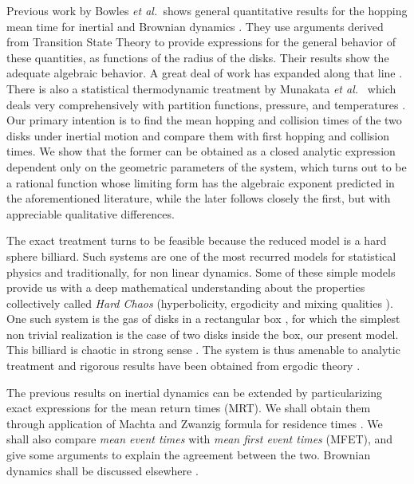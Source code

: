 \documentclass[letterpaper,10pt, jcp, aps]{revtex4-1}
\newcommand{\etal}{\emph{et al.\ }}
\begin{document}
Previous work
by Bowles \etal shows general quantitative results for the hopping 
mean time for inertial and Brownian dynamics \cite{Bowles04}. 
They use arguments derived from Transition State Theory 
to provide expressions for the
general behavior of these quantities, as functions of the
radius of the disks. Their results show the adequate algebraic behavior.
A great deal of work has expanded along that line  \cite{Suh05, Ball09}.
There is also a statistical thermodynamic treatment by Munakata \etal 
which deals very comprehensively with partition functions, pressure,
and temperatures \cite{Munakata02, Munakata06}. 
Our  primary intention is
to find  the mean hopping and collision times of the two disks under 
inertial motion and compare them with first hopping and collision times.
We show that the former can 
be obtained  as a closed analytic expression dependent only
on the geometric parameters of the system, which turns 
out to be a rational function whose limiting form
has the algebraic exponent predicted in the aforementioned literature, while
the later follows closely the first, but with appreciable
qualitative differences. 

The exact treatment  turns to be  feasible because  
the reduced model is a hard sphere billiard. 
Such systems  are one of the most recurred models for
statistical physics and  traditionally, for non linear dynamics.  
Some of these simple models
 provide us with a deep mathematical understanding
about  the properties collectively called  \emph{Hard Chaos} 
(hyperbolicity, ergodicity and mixing qualities \cite{Sinai70, Gallavotti74}). 
One such system is the
gas of disks in a rectangular box \cite{SzaszBook00}, 
for which the simplest non trivial
realization is the case of  two disks inside the box, our
present model.
This billiard is chaotic in
strong sense \cite{Sim99}. The system  is thus amenable
to analytic treatment
and rigorous results have been obtained from ergodic theory \cite{MarkChern}.

The previous  results on
inertial dynamics can be extended  by particularizing 
exact expressions for the mean return times (MRT). 
We shall  obtain them through application of 
Machta and Zwanzig formula for residence times \cite{MachtaZwan}. 
We shall also  compare \emph{mean event times} with 
\emph{mean first event times} (MFET),
and give some arguments to explain the agreement between the two. 
Brownian dynamics shall be discussed elsewhere \cite{WorkInProgress}.
\end{document}
